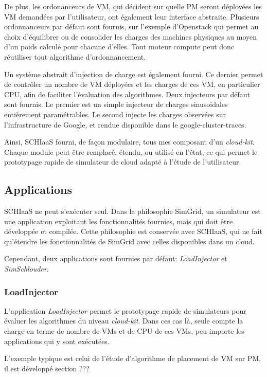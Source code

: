 \documentclass[parallelisme]{compas2017}
\begin{document}
De plus, les ordonanceurs de VM, qui décident sur quelle PM seront déployées les VM demandées
par l'utilisateur, ont également leur interface abstraite. Plusieurs ordonnanceurs par défaut
sont fournis, sur l'exemple d'Openstack qui permet au choix d'équilibrer ou de consolider les 
charges des machines physiques au moyen d'un poids calculé pour chacune d'elles. 
Tout moteur compute peut donc réutiliser tout algorithme d'ordonnancement.

Un système abstrait d'injection de charge est également fourni. Ce dernier permet de contrôler 
un nombre de VM déployées et les charges de ces VM, en particulier CPU, afin de faciliter 
l'évaluation des algorithmes. 
Deux injecteurs par défaut sont fournis. Le premier est un simple injecteur de charges sinusoidales
entièrement paramétrables. Le second injecte les charges observées sur l'infrastructure de Google,
et rendue disponible dans le google-cluster-traces.

Ainsi, SCHIaaS fourni, de façon modulaire, tous mes composant d'un \textit{cloud-kit}. 
Chaque module peut être remplacé, étendu, ou utilisé en l'état, ce qui permet le prototypage
rapide de simulateur de cloud adapté à l'étude de l'utilisateur.

\subsection{Applications}

SCHIaaS ne peut s'exécuter seul. Dans la philosophie SimGrid, un simulateur est une application
exploitant les fonctionnalités fournies, mais qui doit être développée et compilée.
Cette philosophie est conservée avec SCHIaaS, qui ne fait qu'étendre les fonctionnalités de 
SimGrid avec celles disponibles dans un cloud.

Cependant, deux applications sont fournies par défaut: \emph{LoadInjector} et \emph{SimSchlouder}.

\subsubsection{LoadInjector}

L'application \emph{LoadInjector} permet le prototypage rapide de simulateurs pour évaluer les 
algorithmes du niveau \textit{cloud-kit}. Dans ces cas là, seule compte la charge en terme de nombre 
de VMs et de CPU de ces VMs, peu importe les applications qui y sont exécutées.

L'exemple typique est celui de l'étude d'algorithme de placement de VM sur PM, il est développé section ???
\end{document}
